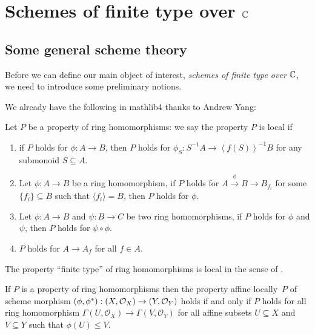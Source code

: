 \chapter{Schemes of finite type over $\mathbb{C}$}

\section{Some general scheme theory}

Before we can define our main object of interest, {\em schemes of finite type over $\mathbb{C}$}, we need to introduce some preliminary notions.

We already have the following in {\sf mathlib4} thanks to Andrew Yang:
\begin{definition}\label{def:ring-hom-prop-local}
  Let $P$ be a property of ring homomorphisms:
    we say the property $P$ is local if
    \begin{enumerate}
      \item if $P$ holds for $\phi : A \to B$, then $P$ holds for $\phi_S: S^{-1}A \to \left\langle f(S)\right\rangle^{-1} B$ for any submonoid $S \subseteq A$.
      \item Let $\phi : A \to B$ be a ring homomorphism, if $P$ holds for $A \stackrel{\phi}{\to} B \to B_{f_i}$ for some $\{f_i\} \subseteq B$ such that $\langle f_i\rangle = B$, then $P$ holds for $\phi$.
      \item Let $\phi : A \to B$ and $\psi : B \to C$ be two ring homomorphisms, if $P$ holds for $\phi$ and $\psi$, then $P$ holds for $\psi \circ \phi$.
      \item $P$ holds for $A \to A_f$ for all $f \in A$.
    \end{enumerate}
\end{definition}

\begin{proposition}
  The property ``finite type'' of ring homomorphisms is local in the sense of .
\end{proposition}

\begin{definition}
  If $P$ is a property of ring homomorphisms then the property {\rm affine locally}~$P$ of scheme morphism $(\phi, \phi^*): \left(X, \mathcal{O}_{X}\right) \to \left(Y, \mathcal{O}_{Y}\right)$ holds if and only if $P$ holds for all ring homomorphism $\Gamma(U, \mathcal{O}_X) \to \Gamma(V, \mathcal{O}_Y)$ for all affine subsets $U \subseteq X$ and $V \subseteq Y$ such that $\phi(U) \le V$.

\end{definition}


